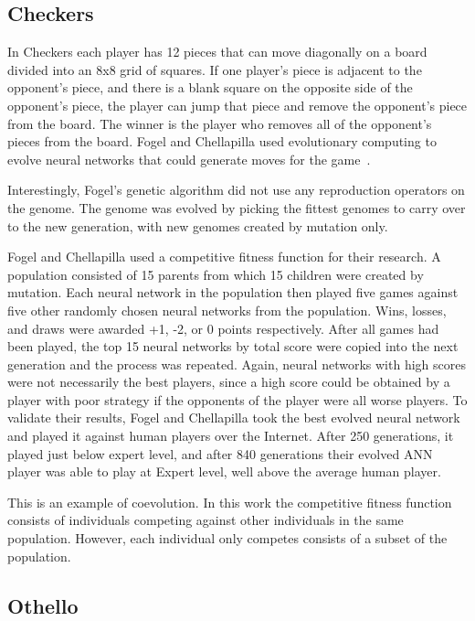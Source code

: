 \subsection{Checkers}

In Checkers each player has 12 pieces that can move diagonally on a board
divided into an 8x8 grid of squares. If one player's piece is adjacent to the
opponent's piece, and there is a blank square on the opposite side of the
opponent's piece, the player can jump that piece and remove the opponent's piece
from the board. The winner is the player who removes all of the opponent's
pieces from the board. Fogel and Chellapilla used evolutionary computing  to
evolve neural networks that could generate moves for the
game~\cite{Fogel2000Anaconda,journals/tec/ChellapillaF01}. 

Interestingly, Fogel's genetic algorithm did not use any reproduction operators
on the genome. The genome was evolved by picking the fittest genomes to carry
over to the new generation, with new genomes created by mutation only.

Fogel and Chellapilla used a competitive fitness function for their research.
A population consisted of 15 parents from which 15 children were created by
mutation. Each neural network in the population then played five games against
five other randomly chosen neural networks from the population. Wins, losses,
and draws were awarded +1, -2, or 0 points respectively. After all games had
been played, the top 15 neural networks by total score were copied into the next
generation and the process was repeated. Again, neural networks with high scores
were not necessarily the best players, since a high score could be obtained by a
player with poor strategy if the opponents of the player were all worse players.
To validate their results, Fogel and Chellapilla took the best evolved neural
network and played it against human players over the Internet. After 250
generations, it played just below expert level, and after 840 generations their
evolved ANN player was able to play at Expert level, well above the average
human player.

This is an example of coevolution. In this work the competitive fitness function
consists of individuals competing against other individuals in the same
population. However, each individual only competes consists of a subset of the
population.

\subsection{Othello}

